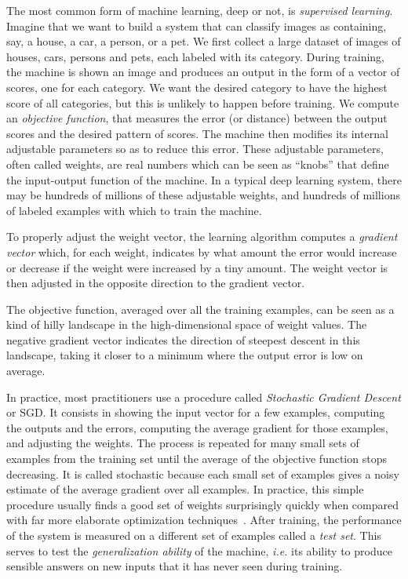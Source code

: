 \documentclass[10pts]{article}
\begin{document}
The most common form of machine learning, deep or not, is {\em
  supervised learning}. Imagine that we want to build a system that
can classify images as containing, say, a house, a car, a person, or a
pet. We first collect a large dataset of images of houses, cars,
persons and pets, each labeled with its category. During training, the
machine is shown an image and produces an output in the form of
a vector of scores, one for each category. We want the desired
category to have the highest score of all categories, but this is
unlikely to happen before training.  We compute an {\em objective
  function}, that measures the error (or distance) between the output
scores and the desired pattern of scores. The machine then modifies
its internal adjustable parameters so as to reduce this error. These
adjustable parameters, often called weights, are real numbers which
can be seen as ``knobs'' that define the input-output function of the
machine. In a typical deep learning system, there may be hundreds of
millions of these adjustable weights, and hundreds of millions
of labeled examples with which to train the machine.

To properly adjust the weight vector, the learning algorithm computes
a {\em gradient vector} which, for each weight, indicates by what
amount the error would increase or decrease if the weight were
increased by a tiny amount. The weight vector is then adjusted in the
opposite direction to the gradient vector. 

The objective function, averaged over all the training examples, can
be seen as a kind of hilly landscape in the high-dimensional space of
weight values. The negative gradient vector indicates the direction of
steepest descent in this landscape, taking it closer to a minimum
where the output error is low on average.

In practice, most practitioners use a procedure called {\em Stochastic
  Gradient Descent} or SGD. It consists in showing the input vector
for a few examples, computing the outputs and the errors, computing
the average gradient for those examples, and adjusting the
weights. The process is repeated for many small sets of examples
from the training set until the average of the objective function stops
decreasing. It is called stochastic because each small set of examples
gives a noisy estimate of the average gradient over all examples. In
practice, this simple procedure usually finds a good set of weights
surprisingly quickly when compared with far more elaborate
optimization techniques~\cite{bottou-bousquet-2008-small}. After
training, the performance of the system is measured on a different set
of examples called a {\em test set}. This serves to test the {\em
  generalization ability} of the machine, {\it i.e.} its ability to
produce sensible answers on new inputs that it has never seen during
training.
\end{document}
